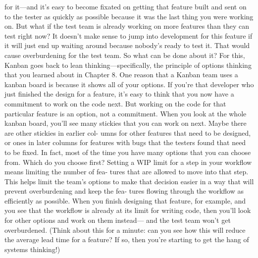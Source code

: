 \begin{itemize}
    for it—and it's easy to become fixated on getting that feature built and sent on to the
    tester as quickly as possible because it was the last thing you were working on.
    But what if the test team is already working on more features than they can test right
    now? It doesn't make sense to jump into development for this feature if it will just end
    up waiting around because nobody's ready to test it. That would cause overburdening
    for the test team. So what can be done about it?
    For this, Kanban goes back to lean thinking—specifically, the principle of options
    thinking that you learned about in Chapter 8. One reason that a Kanban team uses a
    kanban board is because it shows all of your options. If you're that developer who just
    finished the design for a feature, it's easy to think that you now have a commitment to
    work on the code next. But working on the code for that particular feature is an
    option, not a commitment. When you look at the whole kanban board, you'll see
    many stickies that you can work on next. Maybe there are other stickies in earlier col-
    umns for other features that need to be designed, or ones in later columns for features
    with bugs that the testers found that need to be fixed. In fact, most of the time you
    have many options that you can choose from. Which do you choose first?
    Setting a WIP limit for a step in your workflow means limiting the number of fea-
    tures that are allowed to move into that step. This helps limit the team's options to
    make that decision easier in a way that will prevent overburdening and keep the fea-
    tures flowing through the workflow as efficiently as possible. When you finish
    designing that feature, for example, and you see that the workflow is already at its
    limit for writing code, then you'll look for other options and work on them instead—
    and the test team won't get overburdened. (Think about this for a minute: can you see
    how this will reduce the average lead time for a feature? If so, then you're starting to
    get the hang of systems thinking!)


\end{itemize}
